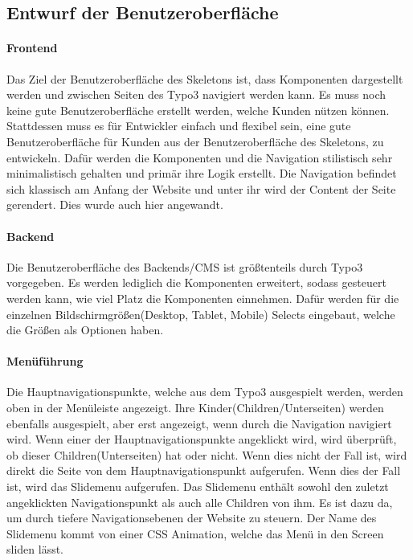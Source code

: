 \subsection{Entwurf der Benutzeroberfläche}
\label{sec:Benutzeroberflaeche} 

\paragraph{Frontend} 
\linebreak
Das Ziel der Benutzeroberfläche des Skeletons ist, dass Komponenten dargestellt werden und zwischen Seiten des Typo3 navigiert werden kann. Es muss noch keine gute Benutzeroberfläche erstellt werden, welche Kunden nützen können. Stattdessen muss es für Entwickler einfach und flexibel sein, eine gute Benutzeroberfläche für Kunden aus der Benutzeroberfläche des Skeletons, zu entwickeln. Dafür werden die Komponenten und die Navigation stilistisch sehr minimalistisch gehalten und primär ihre Logik erstellt. Die Navigation befindet sich klassisch am Anfang der Website und unter ihr wird der Content der Seite gerendert. Dies wurde auch hier angewandt.


\paragraph{Backend} 
\linebreak 
Die Benutzeroberfläche des Backends/CMS ist größtenteils durch Typo3 vorgegeben. Es werden lediglich die Komponenten erweitert, sodass gesteuert werden kann, wie viel Platz die Komponenten einnehmen. Dafür werden für die einzelnen Bildschirmgrößen(Desktop, Tablet, Mobile) Selects eingebaut, welche die Größen als Optionen haben.

\paragraph{Menüführung}  
\linebreak
Die Hauptnavigationspunkte, welche aus dem Typo3 ausgespielt werden, werden oben in der Menüleiste angezeigt. Ihre Kinder(Children/Unterseiten) werden ebenfalls ausgespielt, aber erst angezeigt, wenn durch die Navigation navigiert wird. Wenn einer der Hauptnavigationspunkte angeklickt wird, wird überprüft, ob dieser Children(Unterseiten) hat oder nicht. Wenn dies nicht der Fall ist, wird direkt die Seite von dem Hauptnavigationspunkt aufgerufen. Wenn dies der Fall ist, wird das Slidemenu aufgerufen. Das Slidemenu enthält sowohl den zuletzt angeklickten Navigationspunkt als auch alle Children von ihm. Es ist dazu da, um durch tiefere Navigationsebenen der Website zu steuern. Der Name des Slidemenu kommt von einer CSS Animation, welche das Menü in den Screen sliden lässt. 

